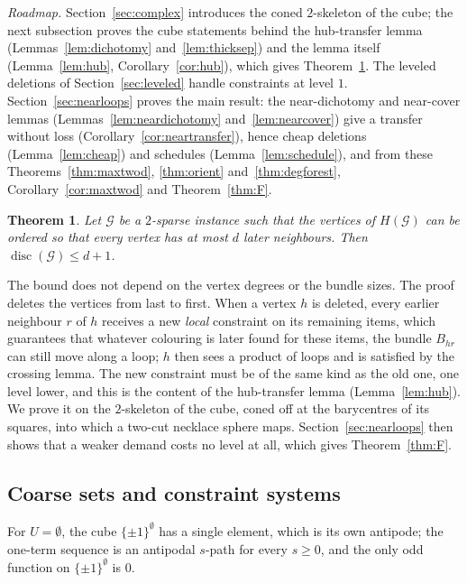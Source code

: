 \documentclass[11pt,letterpaper]{article}
\newtheorem{theorem}{Theorem}[section]
\theoremstyle{definition}
\newcommand{\cG}{\mathcal{G}}
\newcommand{\cube}[1]{\{\pm1\}^{#1}}
\DeclareMathOperator{\disc}{disc}
\begin{document}
\emph{Roadmap.} Section~\ref{sec:complex} introduces the coned $2$-skeleton of the cube; the next
subsection proves the cube statements behind the hub-transfer lemma (Lemmas~\ref{lem:dichotomy}
and~\ref{lem:thicksep}) and the lemma itself (Lemma~\ref{lem:hub}, Corollary~\ref{cor:hub}), which gives
Theorem~\ref{thm:Finst}. The leveled
deletions of Section~\ref{sec:leveled} handle constraints at level $1$. Section~\ref{sec:nearloops}
proves the main result: the near-dichotomy and near-cover lemmas (Lemmas~\ref{lem:neardichotomy}
and~\ref{lem:nearcover}) give a transfer without loss (Corollary~\ref{cor:neartransfer}), hence cheap
deletions (Lemma~\ref{lem:cheap}) and schedules (Lemma~\ref{lem:schedule}), and from these
Theorems~\ref{thm:maxtwod}, \ref{thm:orient} and~\ref{thm:degforest}, Corollary~\ref{cor:maxtwod} and
Theorem~\ref{thm:F}.

\begin{theorem}\label{thm:Finst}
Let $\cG$ be a $2$-sparse instance such that the vertices of $H(\cG)$ can be ordered so that every
vertex has at most $d$ later neighbours. Then $\disc(\cG)\le d+1$.
\end{theorem}

The bound does not depend on the vertex degrees or the bundle sizes. The proof deletes the
vertices from last to first. When a vertex $h$ is deleted, every earlier neighbour $r$ of $h$
receives a new \emph{local} constraint on its remaining items, which guarantees that whatever
colouring is later found for these items, the bundle $B_{hr}$ can still move along a loop; $h$
then sees a product of loops and is satisfied by the crossing lemma. The new constraint must be of
the same kind as the old one, one level lower, and this is the content of the hub-transfer lemma
(Lemma~\ref{lem:hub}). We prove it on the $2$-skeleton of the cube, coned off at the barycentres of
its squares, into which a two-cut necklace sphere maps. Section~\ref{sec:nearloops} then shows that a
weaker demand costs no level at all, which gives Theorem~\ref{thm:F}.

\subsection{Coarse sets and constraint systems}

For $U=\emptyset$, the cube $\cube{\emptyset}$ has a single element, which is its own antipode;
the one-term sequence is an antipodal $s$-path for every $s\ge0$, and the only odd function on
$\cube\emptyset$ is $0$.
\end{document}

